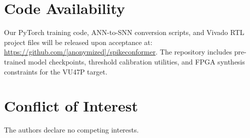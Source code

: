 \documentclass[11pt,a4paper]{article}
\begin{document}
\section*{Code Availability}
Our PyTorch training code, ANN-to-SNN conversion scripts, and Vivado RTL project files will be released upon acceptance at: \url{https://github.com/[anonymized]/spikeconformer}. The repository includes pre-trained model checkpoints, threshold calibration utilities, and FPGA synthesis constraints for the VU47P target.

\section*{Conflict of Interest}
The authors declare no competing interests.



\end{document}
